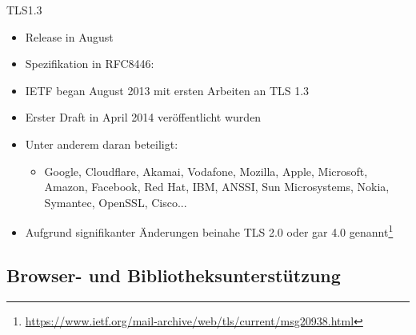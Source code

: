 \documentclass{f4_beamer_metropolis}
\begin{document}
\begin{frame}{TLS1.3}
  \begin{itemize}
    \item Release in August \citeyear{RFC8446}
    \item Spezifikation in RFC8446: \textit{}
    \item IETF began August 2013 mit ersten Arbeiten an TLS 1.3
    \item Erster Draft in April 2014 veröffentlicht wurden
    \item Unter anderem daran beteiligt:
    \begin{itemize}
      \item Google, Cloudflare, Akamai, Vodafone, Mozilla, Apple, Microsoft, Amazon, Facebook, Red Hat, IBM, ANSSI, Sun Microsystems, Nokia, Symantec, OpenSSL, Cisco...
    \end{itemize}
    \item Aufgrund signifikanter Änderungen beinahe TLS 2.0 oder gar 4.0 genannt\footnote{\url{https://www.ietf.org/mail-archive/web/tls/current/msg20938.html}}
  \end{itemize}

\end{frame}


\subsection{Browser- und Bibliotheksunterstützung}
\end{document}
